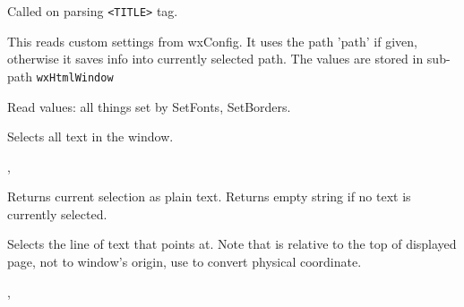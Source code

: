 
Called on parsing {\tt <TITLE>} tag.


\label{wxhtmlwindowreadcustomization}


This reads custom settings from wxConfig. It uses the path 'path'
if given, otherwise it saves info into currently selected path.
The values are stored in sub-path {\tt wxHtmlWindow}

Read values: all things set by SetFonts, SetBorders.




\label{wxhtmlwindowselectall}


Selects all text in the window.


,

\label{wxhtmlwindowselectiontotext}


Returns current selection as plain text. Returns empty string if no text
is currently selected.

\label{wxhtmlwindowselectline}


Selects the line of text that  points at. Note that 
is relative to the top of displayed page, not to window's origin, use
to convert physical coordinate.


,

\label{wxhtmlwindowselectword}

